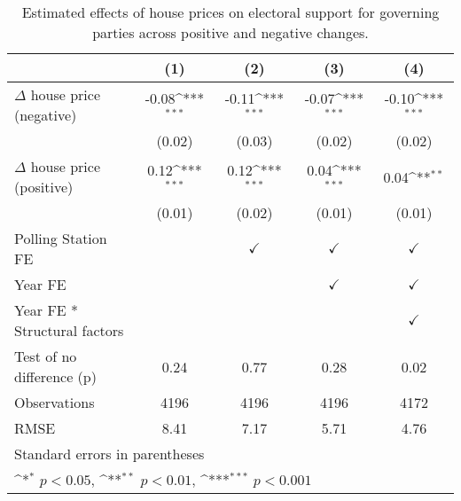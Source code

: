 \begin{table}[htbp]\centering
\def\sym#1{\ifmmode^{#1}\else\(^{#1}\)\fi}
\caption{Estimated effects of house prices on electoral support for governing parties across positive and negative changes.}
\begin{tabular}{l*{4}{c}}
\hline\hline
                    &\multicolumn{1}{c}{(1)}         &\multicolumn{1}{c}{(2)}         &\multicolumn{1}{c}{(3)}         &\multicolumn{1}{c}{(4)}         \\
\hline
$\Delta$ house price (negative)&       -0.08\sym{***}&       -0.11\sym{***}&       -0.07\sym{***}&       -0.10\sym{***}\\
                    &      (0.02)         &      (0.03)         &      (0.02)         &      (0.02)         \\
[1em]
$\Delta$ house price (positive)&        0.12\sym{***}&        0.12\sym{***}&        0.04\sym{***}&        0.04\sym{**} \\
                    &      (0.01)         &      (0.02)         &      (0.01)         &      (0.01)         \\
[1em]
\hline Polling Station FE&                     &$\checkmark$         &$\checkmark$         &$\checkmark$         \\
[1em]
Year FE             &                     &                     &$\checkmark$         &$\checkmark$         \\
[1em]
Year FE * Structural factors&                     &                     &                     &$\checkmark$         \\
\hline
Test of no difference (p)&        0.24         &        0.77         &        0.28         &        0.02         \\
Observations        &        4196         &        4196         &        4196         &        4172         \\
RMSE                &        8.41         &        7.17         &        5.71         &        4.76         \\
\hline\hline
\multicolumn{5}{l}{\footnotesize Standard errors in parentheses}\\
\multicolumn{5}{l}{\footnotesize \sym{*} \(p<0.05\), \sym{**} \(p<0.01\), \sym{***} \(p<0.001\)}\\
\end{tabular}
\end{table}
